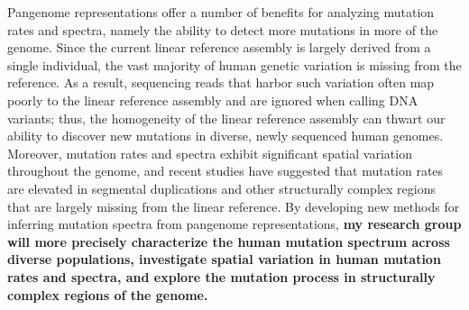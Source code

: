 \documentclass[11pt,a4paper,sans]{moderncv}
\begin{document}
Pangenome representations offer a number of benefits for analyzing mutation rates 
and spectra, namely the ability to detect more mutations in more of the genome. 
Since the current linear reference assembly is largely derived from a single 
individual, the vast majority of human genetic variation is missing from the 
reference. As a result, sequencing reads that harbor such variation often map 
poorly to the linear reference assembly and are ignored when calling DNA variants;
thus, the homogeneity of the linear reference assembly can thwart our ability 
to discover new mutations in diverse, newly sequenced human genomes. Moreover, 
mutation rates and spectra exhibit significant spatial variation throughout the 
genome, and recent studies have suggested that mutation rates are elevated in 
segmental duplications and other structurally complex regions that are largely 
missing from the linear reference. By developing new methods for inferring mutation
spectra from pangenome representations, \textbf{my research group will more precisely 
characterize the human mutation spectrum across diverse populations, investigate
spatial variation in human mutation rates and spectra, and explore the mutation
process in structurally complex regions of the genome.}
\end{document}
